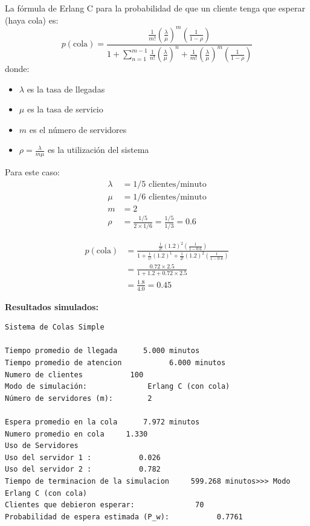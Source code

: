 \documentclass{article}
\begin{document}
La fórmula de Erlang C para la probabilidad de que un cliente tenga que esperar (haya cola) es:
\begin{equation*}
p(\text{cola}) = \frac{\frac{1}{m!}\left(\frac{\lambda}{\mu}\right)^m \left( \frac{1}{1-\rho} \right)}{1 + \sum_{n=1}^{m-1} \frac{1}{n!}\left(\frac{\lambda}{\mu}\right)^n + \frac{1}{m!}\left(\frac{\lambda}{\mu}\right)^m \left( \frac{1}{1-\rho} \right)}
\end{equation*}
donde:
\begin{itemize}
    \item $\lambda$ es la tasa de llegadas
    \item $\mu$ es la tasa de servicio
    \item $m$ es el número de servidores
    \item $\rho = \frac{\lambda}{m\mu}$ es la utilización del sistema
\end{itemize}

Para este caso:
\begin{align*}
    \lambda &= 1/5 \text{ clientes/minuto} \\
    \mu &= 1/6 \text{ clientes/minuto} \\
    m &= 2 \\
    \rho &= \frac{1/5}{2 \times 1/6} = \frac{1/5}{1/3} = 0.6
\end{align*}

\begin{align*}
p(\text{cola}) &= \frac{\frac{1}{2!}\left(1.2\right)^2 \left( \frac{1}{1-0.6} \right)}{1 + \frac{1}{1!}(1.2)^1 + \frac{1}{2!}(1.2)^2 \left( \frac{1}{1-0.6} \right)} \\
    &= \frac{0.72 \times 2.5}{1 + 1.2 + 0.72 \times 2.5} \\
    &= \frac{1.8}{4.0} = 0.45
\end{align*}

\textbf{Resultados simulados:}

\begin{verbatim}
Sistema de Colas Simple

Tiempo promedio de llegada      5.000 minutos
Tiempo promedio de atencion           6.000 minutos
Numero de clientes           100
Modo de simulación:              Erlang C (con cola)
Número de servidores (m):        2

Espera promedio en la cola      7.972 minutos
Numero promedio en cola     1.330
Uso de Servidores
Uso del servidor 1 :           0.026
Uso del servidor 2 :           0.782
Tiempo de terminacion de la simulacion     599.268 minutos>>> Modo Erlang C (con cola)
Clientes que debieron esperar:              70
Probabilidad de espera estimada (P_w):           0.7761
\end{verbatim}
\end{document}
